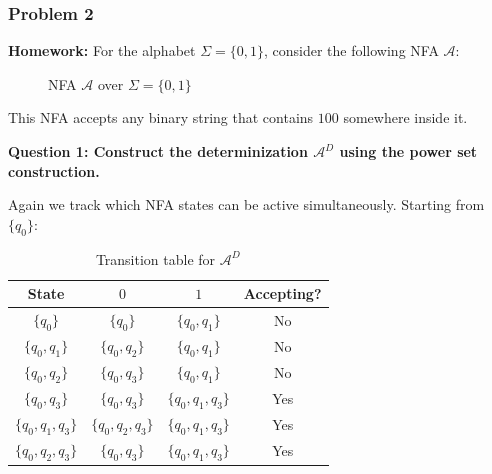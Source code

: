 \documentclass{article}
\theoremstyle{theorem}
\theoremstyle{definition}
\theoremstyle{remark}
\begin{document}
\subsubsection{Problem 2}

\textbf{Homework:} For the alphabet $\Sigma = \{0, 1\}$, consider the following NFA $\mathcal{A}$:

\begin{figure}[H]
  \centering
  \caption{NFA $\mathcal{A}$ over $\Sigma = \{0,1\}$}
\end{figure}

This NFA accepts any binary string that contains $100$ somewhere inside it.

\textbf{Question 1: Construct the determinization $\mathcal{A}^D$ using the power set construction.}

Again we track which NFA states can be active simultaneously. Starting from $\{q_0\}$:

\begin{table}[H]
  \centering
  \renewcommand{\arraystretch}{1.2}
  \begin{tabular}{|c|c|c|c|}
    \hline
    State & $0$ & $1$ & Accepting? \\ \hline
    $\{q_0\}$ & $\{q_0\}$ & $\{q_0, q_1\}$ & No \\ \hline
    $\{q_0, q_1\}$ & $\{q_0, q_2\}$ & $\{q_0, q_1\}$ & No \\ \hline
    $\{q_0, q_2\}$ & $\{q_0, q_3\}$ & $\{q_0, q_1\}$ & No \\ \hline
    $\{q_0, q_3\}$ & $\{q_0, q_3\}$ & $\{q_0, q_1, q_3\}$ & Yes \\ \hline
    $\{q_0, q_1, q_3\}$ & $\{q_0, q_2, q_3\}$ & $\{q_0, q_1, q_3\}$ & Yes \\ \hline
    $\{q_0, q_2, q_3\}$ & $\{q_0, q_3\}$ & $\{q_0, q_1, q_3\}$ & Yes \\ \hline
  \end{tabular}
  \caption{Transition table for $\mathcal{A}^D$}
\end{table}
\end{document}
